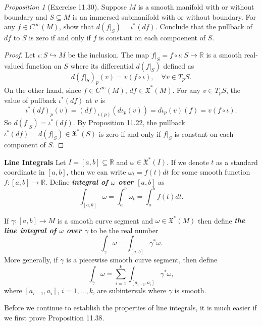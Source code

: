 \documentclass[a4paper]{article}
\theoremstyle{remark}
\newtheorem{prop}{Proposition}
\newcommand{\er}{\mathbb{R}} %
\newcommand{\subhim}{\subseteq} %
\newcommand{\CM}{C^{\infty}(M)} %
\newcommand{\VF}{\mathfrak{X}} %
\begin{document}
\begin{prop}[Exercise 11.30]
Suppose $M$ is a smooth manifold with or without boundary and $S \subhim M$ is an immersed submanifold with or without boundary. For any $f \in \CM$, show that $d(f|_S)= \iota^*(df)$. Conclude that the pullback of $df$ to $S$ is zero if and only if $f$ is constant on each compoenent of $S$. 
\end{prop}
\begin{proof}
Let $\iota :S \hookrightarrow M$ be the inclusion. The map $f|_S = f \circ \iota : S \to \er$ is a smooth real-valued function on $S$ where its differential $d(f|_S)$ defined as
$$
d(f|_S)_p(v) = v (f \circ \iota), \quad \forall v \in T_pS.
$$
On the other hand, since $f \in \CM$, $df \in \VF^*(M)$. For any $v \in T_pS$,  the value of pullback $\iota^*(df)$ at $v$ is
$$
\iota^*(df)_p (v) = (df)_{\iota(p)} (d\iota_p(v)) = d\iota_p(v) (f) = v(f \circ \iota).
$$
So $d(f|_S) = \iota^*(df)$. By Proposition 11.22, the pullback $\iota^*(df)=d(f|_S) \in \VF^*(S)$ is zero if and only if $f|_S$ is constant on each component of $S$.
\end{proof}

\textbf{Line Integrals } Let $I = [a,b] \subhim \er$ and $\omega \in\VF^*(I)$. If we denote $t$ as a standard coordinate in $[a,b]$, then we can write $\omega_t = f(t) dt$ for some smooth function $f : [a,b] \to \er$. Define \textbf{\textit{integral of $\omega$ over $[a,b]$}} as
$$
\int_{[a,b]} \omega = \int_{a}^{b} \omega_t =\int_{a}^{b} f(t) dt.
$$

If $\gamma : [a,b] \to M$ is a smooth curve segment and $\omega \in \VF^*(M)$ then define \textbf{\textit{the line integral of $\omega$ over $\gamma$ }} to be the real number
$$
\int_{\gamma} \omega = \int_{[a,b]} \gamma^*\omega.
$$
More generally, if $\gamma$ is a piecewise smooth curve segment, then define
$$
\int_{\gamma} \omega = \sum_{i=1}^{k} \int_{[a_{i-1},a_i]} \gamma^*\omega,
$$ 
where $[a_{i-1},a_i]$, $i=1,\dots,k$, are subintervals where $\gamma$ is smooth. 


Before we continue to establish the properties of line integrals, it is much easier if we first prove Proposition 11.38.
\end{document}
